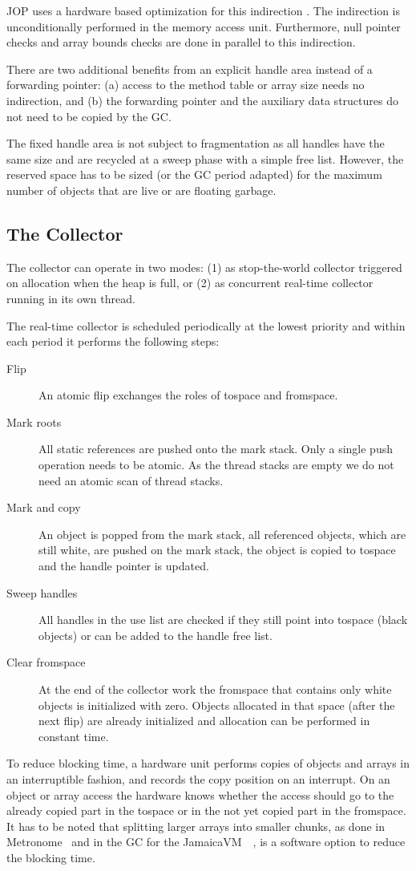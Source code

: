 JOP uses a hardware based optimization for this indirection
\cite{jop:oohw:jtres2007}. The indirection is unconditionally
performed in the memory access unit. Furthermore, null pointer checks
and array bounds checks are done in parallel to this indirection.

There are two additional benefits from an explicit handle area instead of a
forwarding pointer: (a) access to the method table or array size needs no
indirection, and (b) the forwarding pointer and the auxiliary data
structures do not need to be copied by the GC.

The fixed handle area is not subject to fragmentation as all handles
have the same size and are recycled at a sweep phase with a simple
free list. However, the reserved space has to be sized (or the GC
period adapted) for the maximum number of objects that are live or
are floating garbage.


\subsection{The Collector}

The collector can operate in two modes: (1) as stop-the-world
collector triggered on allocation when the heap is full, or (2) as
concurrent real-time collector running in its own thread.

The real-time collector is scheduled periodically at the lowest
priority and within each period it performs the following steps:
\begin{description}
    \item[Flip] An atomic flip exchanges the roles of tospace and
    fromspace.
    \item[Mark roots] All static references are pushed onto the mark
    stack. Only a single push operation needs to be atomic. As the
    thread stacks are empty we do not need an atomic scan of thread
    stacks.
    \item[Mark and copy] An object is popped from the mark stack,
    all referenced objects, which are still white, are pushed on the
    mark stack, the object is copied to tospace and the handle
    pointer is updated.
    \item[Sweep handles] All handles in the use list are checked if
    they still point into tospace (black objects) or can be added to
    the handle free list.
    \item[Clear fromspace] At the end of the collector work the
    fromspace that contains only white objects is initialized with
    zero. Objects allocated in that space (after the next flip) are
    already initialized and allocation can be performed in constant
    time.
\end{description}
%
To reduce blocking time, a hardware unit performs copies of objects
and arrays in an interruptible fashion, and records the copy position
on an interrupt. On an object or array access the hardware knows
whether the access should go to the already copied part in the
tospace or in the not yet copied part in the fromspace. It has to be
noted that splitting larger arrays into smaller chunks, as done in
Metronome~\cite{gc:bacon03} and in the GC for the
JamaicaVM~~\cite{gc:siebert:phd}, is a software option to reduce the
blocking time.

